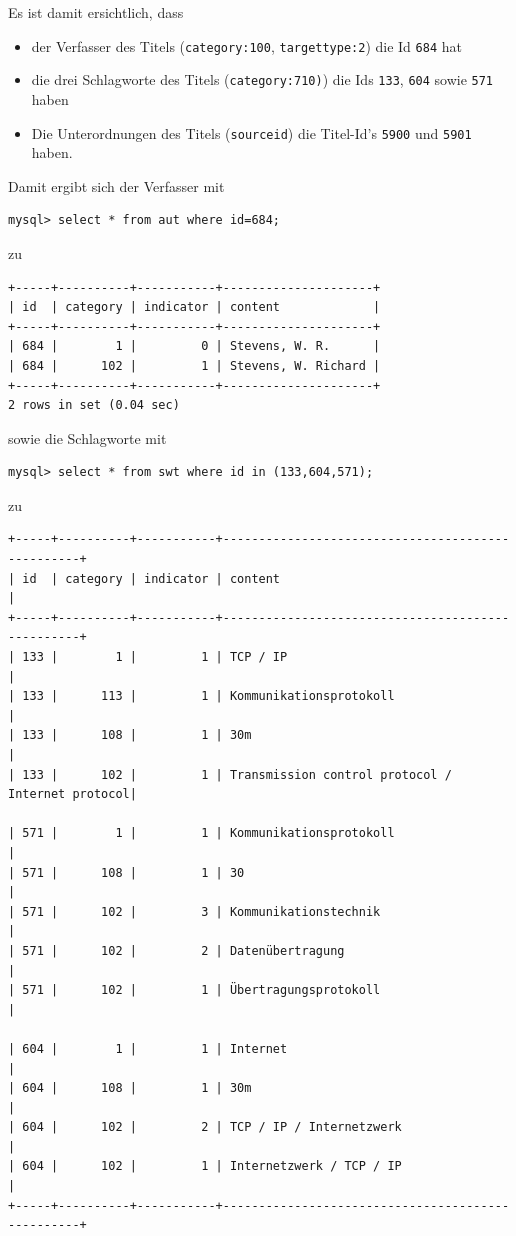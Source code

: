 \documentclass[11pt, twoside, a4paper, BCOR8mm, DIV12, bibtotoc,idxtotoc]{scrbook}
\begin{document}
Es ist damit ersichtlich, dass 

\begin{itemize}
\item der Verfasser des Titels (\texttt{category:100}, \texttt{targettype:2}) die Id \texttt{684} hat
\item die drei Schlagworte des Titels (\texttt{category:710)}) die Ids
  \texttt{133}, \texttt{604} sowie \texttt{571} haben
\item Die Unterordnungen des Titels (\texttt{sourceid}) die Titel-Id's
  \texttt{5900} und \texttt{5901} haben.
\end{itemize}

Damit ergibt sich der Verfasser mit

\begin{verbatim}
mysql> select * from aut where id=684;
\end{verbatim}

zu 

\begin{verbatim}
+-----+----------+-----------+---------------------+
| id  | category | indicator | content             |
+-----+----------+-----------+---------------------+
| 684 |        1 |         0 | Stevens, W. R.      |
| 684 |      102 |         1 | Stevens, W. Richard |
+-----+----------+-----------+---------------------+
2 rows in set (0.04 sec)
\end{verbatim}

sowie die Schlagworte mit 

\begin{verbatim}
mysql> select * from swt where id in (133,604,571);
\end{verbatim}
zu

\begin{verbatim}
+-----+----------+-----------+--------------------------------------------------+
| id  | category | indicator | content                                          |
+-----+----------+-----------+--------------------------------------------------+
| 133 |        1 |         1 | TCP / IP                                         |
| 133 |      113 |         1 | Kommunikationsprotokoll                          |
| 133 |      108 |         1 | 30m                                              |
| 133 |      102 |         1 | Transmission control protocol / Internet protocol|

| 571 |        1 |         1 | Kommunikationsprotokoll                          |
| 571 |      108 |         1 | 30                                               |
| 571 |      102 |         3 | Kommunikationstechnik                            |
| 571 |      102 |         2 | Datenübertragung                                 |
| 571 |      102 |         1 | Übertragungsprotokoll                            |

| 604 |        1 |         1 | Internet                                         |
| 604 |      108 |         1 | 30m                                              |
| 604 |      102 |         2 | TCP / IP / Internetzwerk                         |
| 604 |      102 |         1 | Internetzwerk / TCP / IP                         |
+-----+----------+-----------+--------------------------------------------------+
\end{verbatim}
\end{document}
